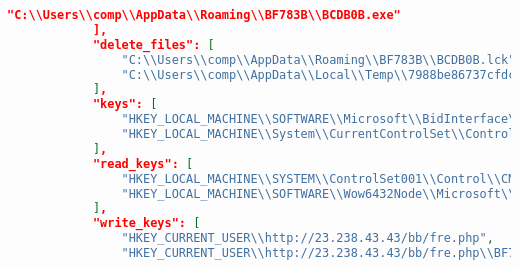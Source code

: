 \begin{lstlisting}[language=json, caption={Example of \emph{behavior} part entries in \emph{report.json} - only examples of entries},captionpos=b, label={lst:report_example}]
                "C:\\Users\\comp\\AppData\\Roaming\\BF783B\\BCDB0B.exe"
            ],
            "delete_files": [
                "C:\\Users\\comp\\AppData\\Roaming\\BF783B\\BCDB0B.lck",
                "C:\\Users\\comp\\AppData\\Local\\Temp\\7988be86737cfdcc6f6a.exe"
            ],
            "keys": [
                "HKEY_LOCAL_MACHINE\\SOFTWARE\\Microsoft\\BidInterface\\Loader",
                "HKEY_LOCAL_MACHINE\\System\\CurrentControlSet\\Control\\CMF\\Config"
            ],
            "read_keys": [
                "HKEY_LOCAL_MACHINE\\SYSTEM\\ControlSet001\\Control\\CMF\\Config\\SYSTEM",
                "HKEY_LOCAL_MACHINE\\SOFTWARE\\Wow6432Node\\Microsoft\\Windows\\Windows Error Reporting\\WMR\\Disable"
            ],
            "write_keys": [
                "HKEY_CURRENT_USER\\http://23.238.43.43/bb/fre.php",
                "HKEY_CURRENT_USER\\http://23.238.43.43/bb/fre.php\\BF783B"

\end{lstlisting}

